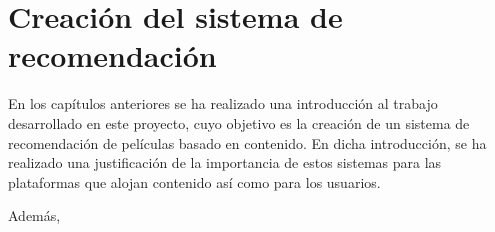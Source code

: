 \chapter{Creación del sistema de recomendación}\label{chap:creacion}


En los capítulos anteriores se ha realizado una introducción al trabajo desarrollado en este proyecto, cuyo objetivo es la creación de un sistema de recomendación de películas basado en contenido. En dicha introducción, se ha realizado una justificación de la importancia de estos sistemas para las plataformas que alojan contenido así como para los usuarios.

Además, 